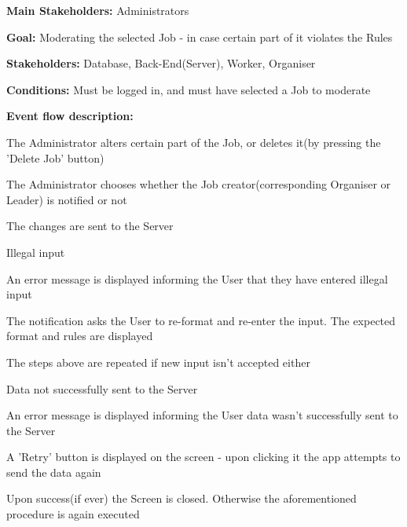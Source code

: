 				\noindent {}
				\begin{packed_item}
					\item \textbf{Main Stakeholders:} Administrators
					\item \textbf{Goal:} Moderating the selected Job - in case certain part of it violates the Rules
					\item \textbf{Stakeholders: } Database, Back-End(Server), Worker, Organiser
					\item \textbf{Conditions: } Must be logged in, and must have selected a Job to moderate
					\item \textbf{Event flow description: }
					\begin{packed_enum}
						\item The Administrator alters certain part of the Job, or deletes it(by pressing the 'Delete Job' button)
						\item The Administrator chooses whether the Job creator(corresponding Organiser or Leader) is notified or not
						\item The changes are sent to the Server
					\end{packed_enum}
					
					\begin{packed_item}
						\item[1.a] Illegal input
						\item[] \begin{packed_enum}
							\item An error message is displayed informing the User that they have entered illegal input
							\item The notification asks the User to re-format and re-enter the input. The expected format and rules are displayed
							\item The steps above are repeated if new input isn't accepted either
						\end{packed_enum}
						
						\item[3.a] Data not successfully sent to the Server
						\item[] \begin{packed_enum}
							\item An error message is displayed informing the User data wasn't successfully sent to the Server
							\item A 'Retry' button is displayed on the screen - upon clicking it the app attempts to send the data again
							\item Upon success(if ever) the Screen is closed. Otherwise the aforementioned procedure is again executed
						\end{packed_enum}
					\end{packed_item}
				\end{packed_item}
			
